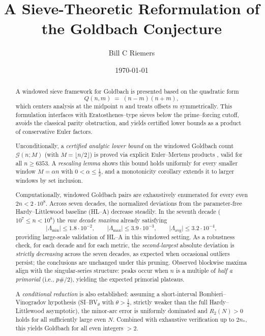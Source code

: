 \documentclass[11pt]{article}
\title{A Sieve-Theoretic Reformulation of the Goldbach Conjecture}
\author{Bill C Riemers}
\date{\today}
\theoremstyle{inline}
\theoremstyle{break}
\theoremstyle{break}
\theoremstyle{break}
\theoremstyle{break}
\theoremstyle{break}
\theoremstyle{break}
\theoremstyle{break}
\theoremstyle{inline}
\newcommand{\xMertens}{6353} %
\newcommand{\xLambdaMinLimit}{1.8\cdot 10^{-2}} %
\newcommand{\xLambdaMaxLimit}{3.9\cdot 10^{-3}} %
\newcommand{\xLambdaAvgLimit}{3.2\cdot 10^{-4}} %
\newcommand{\tavg}{{\scriptscriptstyle\mathrm{avg}}}
\newcommand{\nprodstar}{n_{\ast}}  %
\begin{document}
\maketitle

\begin{abstract}
A windowed sieve framework for Goldbach is presented based on the quadratic form
\begin{equation}
Q(n,m)\;=\;(n-m)(n+m),
\end{equation}
which centers analysis at the midpoint \(n\) and treats offsets \(m\) symmetrically. This formulation interfaces with Eratosthenes–type sieves below the prime–forcing cutoff, avoids the classical parity obstruction, and yields certified lower bounds as a product of conservative Euler factors.

Unconditionally, a \emph{certified analytic lower bound} on the windowed Goldbach count \(\mathcal{G}(n;M)\) (with \(M=\lfloor n/2\rfloor\)) is proved via explicit Euler–Mertens products \cite{Mertens1874,MontgomeryVaughan2007,RosserSchoenfeld1962,Dusart2010}, valid for all \(n\ge \xMertens\). A \emph{rescaling lemma} shows this bound holds uniformly for every smaller window \(M=\alpha n\) with \(0<\alpha\le \tfrac12\), and a monotonicity corollary extends it to larger windows by set inclusion.

Computationally, windowed Goldbach pairs are exhaustively enumerated for every even \(2n<2\cdot 10^8\). 
Across seven decades, the normalized deviations from the parameter-free Hardy–Littlewood baseline (HL–A) \cite{HardyLittlewood1923} decrease steadily. 
In the seventh decade (\(10^7 \le n < 10^8\)) the \emph{raw decade maxima} already satisfying
\begin{equation}
\lvert\Lambda_{\min}\rvert\le \xLambdaMinLimit,\qquad
\lvert\Lambda_{\max}\rvert\le \xLambdaMaxLimit,\qquad
\lvert\Lambda_{\tavg}\rvert\le \xLambdaAvgLimit,
\end{equation}
providing large-scale validation of HL–A in this windowed setting.
As a robustness check, for each decade and for each metric, the \emph{second-largest} absolute deviation is \emph{strictly decreasing} across the seven decades, as expected when occasional outliers persist; the conclusions are unchanged under this pruning.
Observed blockwise maxima align with the singular-series structure: peaks occur when \(n\) is a multiple of \emph{half a primorial} (i.e., \(p\#/2\)), yielding the expected primorial plateaus.

A \emph{conditional reduction} is also established: assuming a short-interval Bombieri–Vinogradov hypothesis (SI–BV\(_\theta\) with \(\theta>\tfrac12\), strictly weaker than the full Hardy–Littlewood asymptotic), the minor-arc error is uniformly dominated and \(R_2(N)>0\) holds for all sufficiently large even \(N\). Combined with exhaustive verification up to \(2\nprodstar\), this yields Goldbach for all even integers \(>2\).


\end{abstract}
\end{document}
